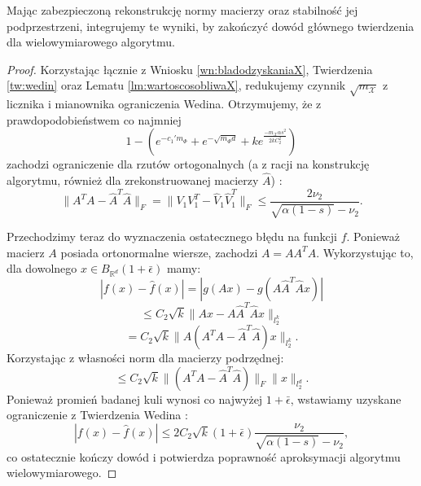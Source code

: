 Mając zabezpieczoną rekonstrukcję normy macierzy oraz stabilność jej podprzestrzeni, integrujemy te wyniki, by zakończyć dowód głównego twierdzenia dla wielowymiarowego algorytmu.

\begin{proof}
Korzystając łącznie z Wniosku \ref{wn:bladodzyskaniaX}, Twierdzenia \ref{tw:wedin} oraz Lematu \ref{lm:wartoscosobliwaX}, redukujemy czynnik $\sqrt{m_\mathcal{X}}$ z licznika i mianownika ograniczenia Wedina. Otrzymujemy, że z prawdopodobieństwem co najmniej
$$1 - \left(e^{-c_1' m_\Phi} + e^{-\sqrt{m_\Phi d}} + k e^{\frac{-m_\mathcal{X} \alpha s^2}{2kC_2^2}}\right)$$
zachodzi ograniczenie dla rzutów ortogonalnych (a z racji na konstrukcję algorytmu, również dla zrekonstruowanej macierzy $\hat{A}$) :
$$\|A^T A - \hat{A}^T \hat{A}\|_F = \|V_1 V_1^T - \hat{V}_1 \hat{V}_1^T\|_F \le \frac{2\nu_2}{\sqrt{\alpha(1-s)} - \nu_2}.$$

Przechodzimy teraz do wyznaczenia ostatecznego błędu na funkcji $f$. Ponieważ macierz $A$ posiada ortonormalne wiersze, zachodzi $A = A A^T A$. Wykorzystując to, dla dowolnego $x \in B_{\mathbb{R}^d}(1+\bar{\epsilon})$ mamy:
$$|f(x) - \hat{f}(x)| = |g(Ax) - g(A \hat{A}^T \hat{A} x)|$$
$$\le C_2\sqrt{k} \|Ax - A\hat{A}^T\hat{A}x\|_{l_2^k}$$
$$= C_2\sqrt{k} \|A(A^T A - \hat{A}^T \hat{A})x\|_{l_2^k}.$$
Korzystając z własności norm dla macierzy podrzędnej:
$$\le C_2\sqrt{k} \|(A^T A - \hat{A}^T \hat{A})\|_F \|x\|_{l_2^d}.$$
Ponieważ promień badanej kuli wynosi co najwyżej $1+\bar{\epsilon}$, wstawiamy uzyskane ograniczenie z Twierdzenia Wedina :
$$|f(x) - \hat{f}(x)| \le 2C_2\sqrt{k}(1+\bar{\epsilon})\frac{\nu_2}{\sqrt{\alpha(1-s)} - \nu_2},$$
co ostatecznie kończy dowód i potwierdza poprawność aproksymacji algorytmu wielowymiarowego. 
\end{proof}